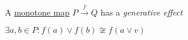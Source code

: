 
A \href{doc/1 math/Seven Sketches in Compositionality/Chapter 1: Generative Effects/4 Monotone maps/1 Monotone map}{monotone map} $P \xrightarrow{f} Q$ has a \emph{generative effect}

$\exists a,b \in P: f(a) \lor f(b) \not\cong f(a \lor v)$

